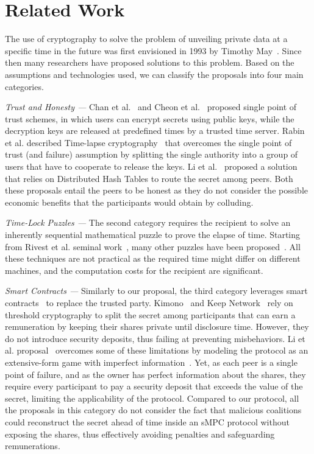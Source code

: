 \section{Related Work}\label{sect:relwork}

The use of cryptography to solve the problem of unveiling private data at a specific time in the future was first envisioned in 1993 by Timothy May~\cite{may1993timed}. Since then many researchers have proposed solutions to this problem.
%
Based on the assumptions and technologies used, we can classify the proposals into four main categories.

\smallskip
{\em Trust and Honesty ---} Chan et al.~\cite{1437112} and Cheon et al.~\cite{10.1007/11889663_17} proposed single point of trust schemes, in which users can encrypt secrets using public keys, while the decryption keys are released at predefined times by a trusted time server.
%
Rabin et al. described Time-lapse cryptography~\cite{rabin2006time,PARKES2008294} that overcomes the single point of trust (and failure) assumption by splitting the single authority into a group of users that have to cooperate to release the keys. Li et al.~\cite{dht} proposed a solution that relies on Distributed Hash Tables to route the secret among peers. Both these proposals entail the peers to be honest as they do not consider the possible economic benefits that the participants would obtain by colluding.

\smallskip
{\em Time-Lock Puzzles ---} The second category requires the recipient to solve an inherently sequential mathematical puzzle to prove the elapse of time. Starting from Rivest et al. seminal work~\cite{Rivest:1996:TPT:888615}, many other puzzles have been proposed~\cite{Bitansky:2016:TPR:2840728.2840745,cohen2018,mahmoody-tl}. All these techniques are not practical as the required time might differ on different machines, and the computation costs for the recipient are significant.

\smallskip
{\em Smart Contracts ---} Similarly to our proposal, the third category leverages smart contracts~\cite{szabo1997formalizing} to replace the trusted party. Kimono~\cite{kimono,kimono-network} and Keep Network~\cite{keep} rely on threshold cryptography to split the secret among participants that can earn a remuneration by keeping their shares private until disclosure time. However, they do not introduce security deposits, thus failing at preventing misbehaviors.
%
Li et al. proposal~\cite{self-emerging1} overcomes some of these limitations by modeling the protocol as an extensive-form game with imperfect information~\cite{leyton2008essentials}. Yet, as each peer is a single point of failure, and as the owner has perfect information about the shares, they require every participant to pay a security deposit that exceeds the value of the secret, limiting the applicability of the protocol.
%
Compared to our protocol, all the proposals in this category do not consider the fact that malicious coalitions could reconstruct the secret ahead of time inside an sMPC protocol without exposing the shares, thus effectively avoiding penalties and safeguarding remunerations.


